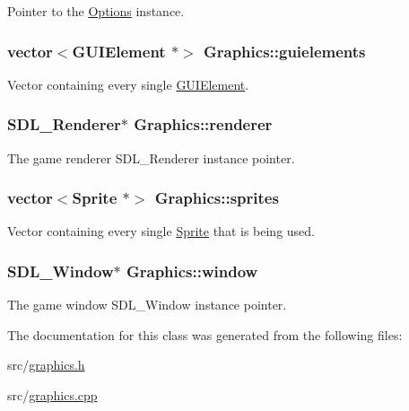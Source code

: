 Pointer to the \hyperlink{class_options}{Options} instance. 

\hypertarget{class_graphics_ac4ea71ee39d3cbc7b3fc14bf89fa400f}{
\subsubsection[{guielements}]{\setlength{\rightskip}{0pt plus 5cm}vector$<${\bf G\-U\-I\-Element} $\ast$$>$ Graphics\-::guielements\hspace{0.3cm}{\ttfamily [protected]}}}\label{class_graphics_ac4ea71ee39d3cbc7b3fc14bf89fa400f}


Vector containing every single \hyperlink{class_g_u_i_element}{G\-U\-I\-Element}. 

\hypertarget{class_graphics_afee9119ae93eafc5707a9e868b539a2e}{
\subsubsection[{renderer}]{\setlength{\rightskip}{0pt plus 5cm}S\-D\-L\-\_\-\-Renderer$\ast$ Graphics\-::renderer}}\label{class_graphics_afee9119ae93eafc5707a9e868b539a2e}


The game renderer S\-D\-L\-\_\-\-Renderer instance pointer. 

\hypertarget{class_graphics_ad01e5a24a1ce34c64f6dd7de4f85fc8b}{
\subsubsection[{sprites}]{\setlength{\rightskip}{0pt plus 5cm}vector$<${\bf Sprite} $\ast$$>$ Graphics\-::sprites\hspace{0.3cm}{\ttfamily [protected]}}}\label{class_graphics_ad01e5a24a1ce34c64f6dd7de4f85fc8b}


Vector containing every single \hyperlink{class_sprite}{Sprite} that is being used. 

\hypertarget{class_graphics_af397f61e26b41302b0b66ee4ab408952}{
\subsubsection[{window}]{\setlength{\rightskip}{0pt plus 5cm}S\-D\-L\-\_\-\-Window$\ast$ Graphics\-::window}}\label{class_graphics_af397f61e26b41302b0b66ee4ab408952}


The game window S\-D\-L\-\_\-\-Window instance pointer. 



The documentation for this class was generated from the following files\-:\begin{DoxyCompactItemize}
\item 
src/\hyperlink{graphics_8h}{graphics.\-h}\item 
src/\hyperlink{graphics_8cpp}{graphics.\-cpp}\end{DoxyCompactItemize}
